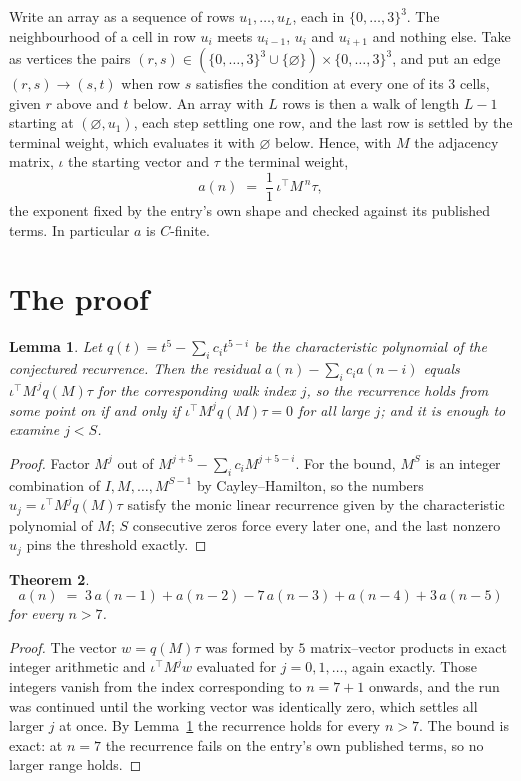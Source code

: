\documentclass[11pt,a4paper]{article}
\theoremstyle{plain}
\newtheorem{theorem}{Theorem}
\newtheorem{lemma}[theorem]{Lemma}
\theoremstyle{definition}
\begin{document}
Write an array as a sequence of rows $u_1,\dots,u_L$, each in
$\{0,\dots,3\}^{3}$. The neighbourhood of a cell in row $u_i$ meets $u_{i-1}$,
$u_i$ and $u_{i+1}$ and nothing else. Take as vertices the pairs
$(r,s)\in(\{0,\dots,3\}^{3}\cup\{\varnothing\})\times\{0,\dots,3\}^{3}$,
and put an edge $(r,s)\to(s,t)$ when row $s$ satisfies the condition at every one of its
$3$ cells, given $r$ above and $t$ below. An array with $L$ rows is then a walk of length
$L-1$ starting at $(\varnothing,u_1)$, each step settling one row, and the last row is
settled by the terminal weight, which evaluates it with $\varnothing$ below. Hence,
with $M$ the adjacency matrix, $\iota$ the starting vector and $\tau$ the terminal weight,
\[
a(n)\;=\;\frac{1}{1}\,\iota^{\!\top}M^{\,n}\tau ,
\]
the exponent fixed by the entry's own shape and checked against its published terms. In
particular $a$ is $C$-finite.

\section{The proof}

\begin{lemma}\label{lem:crit}
Let $q(t)=t^{5}-\sum_i c_it^{5-i}$ be the characteristic polynomial of the
conjectured recurrence. Then the residual $a(n)-\sum_ic_ia(n-i)$ equals
$\iota^{\!\top}M^{\,j}q(M)\tau$ for the corresponding walk index $j$, so the
recurrence holds from some point on if and only if $\iota^{\!\top}M^{j}q(M)\tau=0$ for all
large $j$; and it is enough to examine $j<S$.
\end{lemma}

\begin{proof}
Factor $M^{j}$ out of $M^{j+5}-\sum_ic_iM^{j+5-i}$. For the bound, $M^{S}$
is an integer combination of $I,M,\dots,M^{S-1}$ by Cayley--Hamilton, so the numbers
$u_j=\iota^{\!\top}M^{j}q(M)\tau$ satisfy the monic linear recurrence given by the
characteristic polynomial of $M$; $S$ consecutive zeros force every later one, and the last
nonzero $u_j$ pins the threshold exactly.
\end{proof}

\begin{theorem}
\[
a(n)\;=\;3\,a(n-1) + a(n-2) - 7\,a(n-3) + a(n-4) + 3\,a(n-5)
\]
for every $n>7$.
\end{theorem}

\begin{proof}
The vector $w=q(M)\tau$ was formed by $5$ matrix--vector products in exact integer
arithmetic and $\iota^{\!\top}M^{j}w$ evaluated for $j=0,1,\dots$, again exactly. Those
integers vanish from the index corresponding to $n=7+1$ onwards, and the run was
continued until the working vector was identically zero, which settles all larger $j$ at once.
By Lemma~\ref{lem:crit} the recurrence holds for every $n>7$. The bound is exact: at $n=7$ the recurrence fails on the entry's own published terms, so no larger range holds.
\end{proof}
\end{document}
